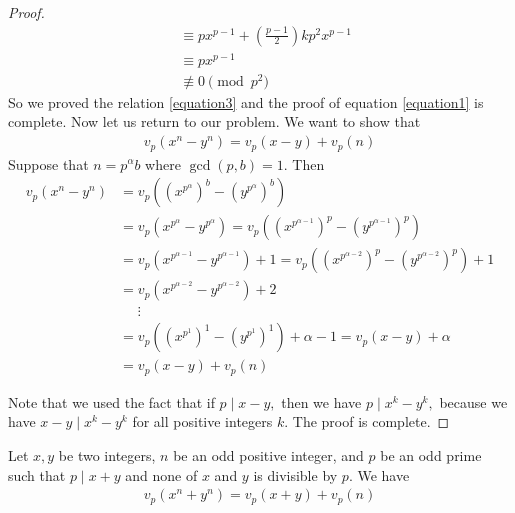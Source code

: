 \begin{proof}
\begin{align*}
                & \equiv px^{p-1} + \left( \frac{p-1}{2} \right) kp^2x^{p-1} \\
                & \equiv px^{p-1}\\
                & \not \equiv 0 \pmod{p^2}
            \end{align*}
        So we proved the relation \eqref{equation3} and the proof of equation \eqref{equation1} is complete.  Now let us return to our problem. We want to show that
            \begin{align*}
            	v_p\left(  x^n - y^n \right) = v_p(  x - y ) + v_p(  n )
            \end{align*}
        Suppose that $n=p^{\alpha}b$ where $\gcd(p,b)=1.$ Then
            \begin{align*}
                v_p(x^n-y^n) & =  v_p\left((x^{p^{\alpha}})^b - (y^{p^{\alpha}})^b \right)  \\
                & =   v_p\left(  x^{p^{\alpha}} -y^{p^{\alpha}}\right) =v_p\left(  (x^{p^{\alpha-1}})^p - (y^{p^{\alpha-1}})^p \right) \\
                & = v_p\left(  x^{p^{\alpha-1}} - y^{p^{\alpha-1}} \right) + 1 =v_p\left(  (x^{p^{\alpha-2}})^p - (y^{p^{\alpha-2}})^p\right) +1  \\
                & = v_p\left(  x^{p^{\alpha-2}} - y^{p^{\alpha-2}} \right) + 2 \\
                & \phantom{=} \vdots \\
                & = v_p\left(  (x^{p^{1}})^1 - (y^{p^{1}})^1  \right) + \alpha -1  = v_p\left(  x-y \right) + \alpha \\
                & =v_p\left(  x-y \right) + v_p\left(  n \right)
            \end{align*}

        Note that we used the fact that if $p \mid x-y,$ then we have $p \mid x^k -y^k,$ because we have $x-y \mid x^k-y^k$ for all positive integers $k.$ The proof is complete.
    \end{proof}



    \begin{theorem}\label{theorem2}
        Let $ x,y$ be two integers, $n$ be an odd positive integer, and $p$ be an odd prime such that $ p\mid x + y$ and none of
        $x$ and $y$ is divisible by $p.$  We have
        	\begin{align*}
        		v_p(  x^n + y^n ) = v_p(  x + y ) + v_p(  n )
        	\end{align*}
    \end{theorem}

